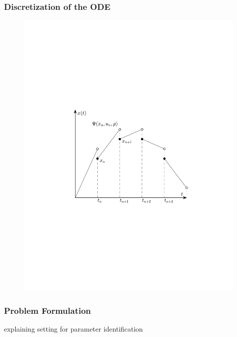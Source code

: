 \begin{frame}
	\frametitle{Discretization of the ODE}
	
	\begin{figure}[bth]
	  \begin{center}
	    \includegraphics[trim=1cm 5cm 0cm 8cm, clip=true, width=\linewidth]{img/multShootPlot}
	  \end{center}
	\end{figure}
\end{frame}

\begin{frame}
    \frametitle{Problem Formulation}
    explaining setting for parameter identification
\end{frame}

